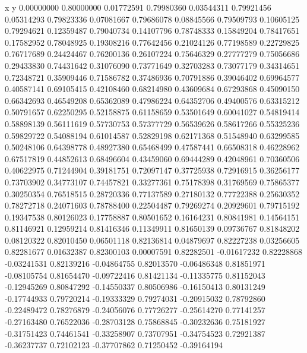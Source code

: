 x y    
0.00000000   0.80000000  
0.01772591   0.79980360  
0.03544311   0.79921456  
0.05314293   0.79823336  
0.07081667   0.79686078  
0.08845566   0.79509793  
0.10605125   0.79294621  
0.12359487   0.79040734  
0.14107796   0.78748333  
0.15849204   0.78417651  
0.17582952   0.78048925  
0.19308216   0.77642456  
0.21024126   0.77198589  
0.22729825   0.76717689  
0.24424467   0.76200136  
0.26107224   0.75646329  
0.27777279   0.75056686  
0.29433830   0.74431642  
0.31076090   0.73771649  
0.32703283   0.73077179  
0.34314651   0.72348721  
0.35909446   0.71586782  
0.37486936   0.70791886  
0.39046402   0.69964577  
0.40587141   0.69105415  
0.42108460   0.68214980  
0.43609684   0.67293868  
0.45090150   0.66342693  
0.46549208   0.65362089  
0.47986224   0.64352706  
0.49400576   0.63315212  
0.50791657   0.62250295  
0.52158875   0.61158659  
0.53501649   0.60041027  
0.54819414   0.58898139  
0.56111619   0.57730753  
0.57377729   0.56539626  
0.58617266   0.55325236  
0.59829722   0.54088194  
0.61014587   0.52829198  
0.62171368   0.51548940  
0.63299585   0.50248106  
0.64398778   0.48927380  
0.65468499   0.47587441  
0.66508318   0.46228962  
0.67517819   0.44852613  
0.68496604   0.43459060  
0.69444289   0.42048961  
0.70360506   0.40622975  
0.71244904   0.39181751  
0.72097147   0.37725938  
0.72916915   0.36256177  
0.73703902   0.34773107  
0.74457821   0.33277361  
0.75178398   0.31769569  
0.75865377   0.30250354  
0.76518515   0.28720336  
0.77137589   0.27180132  
0.77722388   0.25630352  
0.78272718   0.24071603  
0.78788400   0.22504487  
0.79269274   0.20929601  
0.79715192   0.19347538  
0.80126023   0.17758887  
0.80501652   0.16164231  
0.80841981   0.14564151  
0.81146921   0.12959214  
0.81416346   0.11349911  
0.81650139   0.09736767  
0.81848202   0.08120322  
0.82010450   0.06501118  
0.82136814   0.04879697  
0.82227238   0.03256605  
0.82281677   0.01632387  
0.82300103   0.00007591  
0.82282501   -0.01617232 
0.82228868   -0.03241531 
0.82139216   -0.04864755 
0.82013570   -0.06486348 
0.81851971   -0.08105754 
0.81654470   -0.09722416 
0.81421134   -0.11335775 
0.81152043   -0.12945269 
0.80847292   -0.14550337 
0.80506986   -0.16150413 
0.80131249   -0.17744933 
0.79720214   -0.19333329 
0.79274031   -0.20915032 
0.78792860   -0.22489472 
0.78276879   -0.24056076 
0.77726277   -0.25614270 
0.77141257   -0.27163480 
0.76522036   -0.28703128 
0.75868845   -0.30232636 
0.75181927   -0.31751423 
0.74461541   -0.33258907 
0.73707951   -0.34754523 
0.72921387   -0.36237737 
0.72102123   -0.37707862 
0.71250452   -0.39164194 
